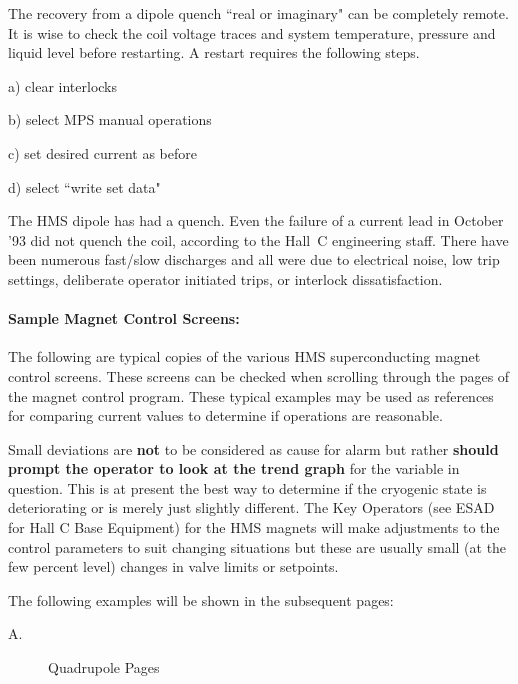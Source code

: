 The recovery from a dipole quench ``real or imaginary" can be
completely remote.  It is wise to check the coil voltage traces and
system temperature, pressure and liquid level before restarting.  A
restart requires the following steps.


\begin{description}
\item{}\hskip0.5in a) clear interlocks
\item{}\hskip0.5in b) select MPS manual operations
\item{}\hskip0.5in c) set desired current as before
\item{}\hskip0.5in d) select ``write set data"
\end{description}


The HMS dipole has  had a quench.  Even the
failure of a current lead in October '93 did not quench the coil, 
according to the Hall~C engineering staff.  There
have been numerous fast/slow discharges and all were due to electrical
noise, low trip settings, deliberate operator initiated trips, or
interlock dissatisfaction.


\paragraph{Sample Magnet Control Screens:}

The following are typical copies of the various HMS superconducting magnet
control screens. These screens can be checked when scrolling through the pages
of the magnet control program. These typical examples may be used as
references for comparing current values to determine if operations are
reasonable.

Small deviations are {\bf not} to be considered as cause for alarm
but rather {\bf should prompt the operator to look at the trend graph} for the
variable in question. This is at present the best way to determine if the
cryogenic state is deteriorating or is merely just slightly different.
The Key Operators (see ESAD for Hall C Base Equipment)
for the HMS magnets will make adjustments to the control
parameters to suit changing situations but these are usually small (at the
few percent level) changes in valve limits or setpoints.

The following examples will be shown in the subsequent pages:


\begin{description}
\item[A.] {Quadrupole Pages}
\end{description}

